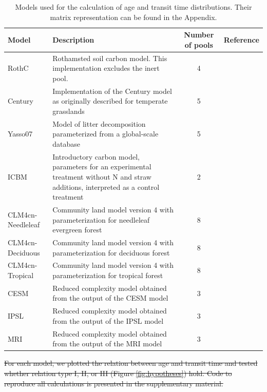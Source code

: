 \documentclass[draft,linenumbers]{agujournal}
\providecommand{\DIFdel}[1]{{\protect\color{red}\sout{#1}}}                      %
\providecommand{\DIFdelbegin}{} %
\begin{document}
\begin{table}[htbp]
   \centering
   \caption{Models used for the calculation of age and transit time distributions. Their matrix representation can be found in the Appendix.} \label{tab:models}
   \begin{tabular}{lp{5cm}cp{2cm}} %
      \toprule
      Model    & Description & Number of pools & Reference \\
      \midrule
      RothC      & Rothamsted soil carbon model. This implementation excludes the inert pool. & 4 & \citet{Jenkinson1990} \\
      Century & Implementation of the Century model as originally described for temperate grasslands & 5 & \citet{Parton1987}  \\ 
      Yasso07 & Model of litter decomposition parameterized from a global-scale database & 5 & \citet{Tuomi2009}  \\ 
      ICBM & Introductory carbon model, parameters for an experimental treatment without N and straw additions, interpreted as a control treatment & 2 & \citet{Andren1997}  \\ 
      CLM4cn-Needleleaf & Community land model version 4 with parameterization for needleleaf evergreen forest & 8 & \citet{Wieder2014}  \\ 
      CLM4cn-Deciduous & Community land model version 4 with parameterization for deciduous forest & 8 & \citet{Wieder2014}  \\ 
      CLM4cn-Tropical & Community land model version 4 with parameterization for tropical forest & 8 & \citet{Wieder2014}  \\ 
      CESM & Reduced complexity model obtained from the output of the CESM model & 3 & \citet{He2016}  \\ 
      IPSL & Reduced complexity model obtained from the output of the IPSL model & 3 & \citet{He2016}  \\ 
      MRI & Reduced complexity model obtained from the output of the MRI model & 3 & \citet{He2016}  \\ 
      \bottomrule
   \end{tabular}
\end{table}



\DIFdelbegin \DIFdel{For each model, we plotted the relation between age and transit time and tested whether relation type I, II, or III (Figure \ref{fig:hypotheses}) hold. Code to reproduce all calculations is presented in the supplementary material. 
}%
\end{document}
